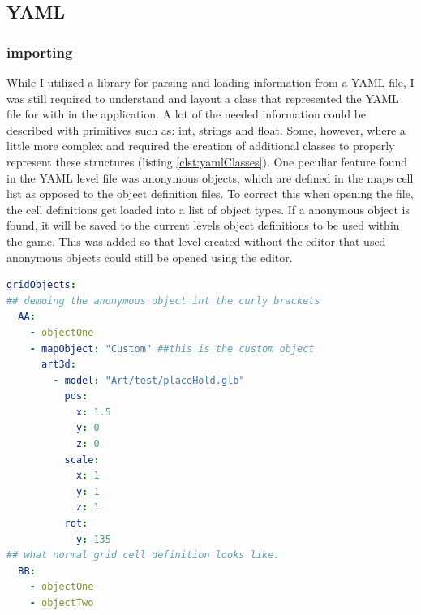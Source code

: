 \subsection{YAML}
\subsubsection{importing}
While I utilized a library for parsing and loading information from a YAML file, I was still required to understand and layout a class that represented the YAML file for with in the application. A lot of the needed information could be described with primitives such as: int, strings and float. Some, however, where a little more complex and required the creation of additional classes to properly represent these structures (listing \ref{clst:yamlClasses}). One peculiar feature found in the YAML level file was anonymous objects, which are defined in the maps cell list as opposed to the object definition files. To correct this when opening the file, the cell definitions get loaded into a list of object types. If a anonymous object is found, it will be saved to the current levels object definitions to be used within the game. This was added so that level created without the editor that used anonymous objects could still be opened using the editor.

\begin{minipage}{\textwidth}
\begin{lstlisting}[language=yaml, caption=demonstartion of anaymous object, label=ylst:anonObjDemo]
gridObjects:
## demoing the anonymous object int the curly brackets
  AA:
    - objectOne
    - mapObject: "Custom" ##this is the custom object
      art3d:
        - model: "Art/test/placeHold.glb"
          pos:
            x: 1.5
            y: 0
            z: 0
          scale:
            x: 1
            y: 1
            z: 1
          rot:
            y: 135
## what normal grid cell definition looks like.
  BB:
    - objectOne
    - objectTwo
\end{lstlisting}
\end{minipage}

